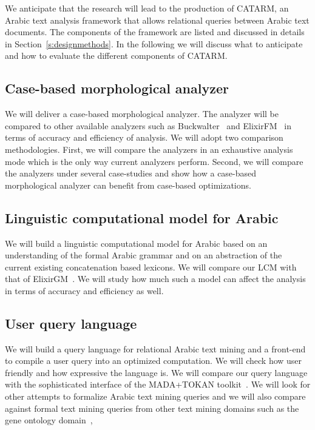 \documentclass[12pt]{article}
\begin{document}
We anticipate that the research will lead to the production of 
CATARM, an Arabic text analysis framework that allows relational 
queries between Arabic text documents.
The components of the framework are listed and discussed
in details in Section~\ref{s:designmethods}.
In the following we will discuss what to anticipate and 
how to evaluate the different components of CATARM. 

\subsection{Case-based morphological analyzer} 

We will deliver a case-based morphological analyzer. 
The analyzer will be compared to other available analyzers such as
Buckwalter~\cite{Tim04} and ElixirFM~\cite{Otakar:07} in terms
of accuracy and efficiency of analysis.
We will adopt two comparison methodologies. 
First, we will compare the analyzers in an exhaustive analysis mode
which is the only way current analyzers perform. 
Second, we will compare the analyzers under several case-studies
and show how a case-based morphological analyzer can benefit
from case-based optimizations.

\subsection{Linguistic computational model for Arabic}

We will build a linguistic computational model for Arabic 
based on an understanding of the formal Arabic grammar 
and on an abstraction of the current existing concatenation
based lexicons.
We will compare our LCM with that of ElixirGM~\cite{Otakar:07}.
We will study how much such a model can affect the analysis
in terms of accuracy and efficiency as well. 

\subsection{User query language}

We will build a query language for relational Arabic text mining 
and a front-end to compile a user query into an optimized
computation. 
We will check how user friendly and how expressive the language is.
We will compare our query language with the sophisticated 
interface of the MADA+TOKAN toolkit~\cite{Habash:09}.
We will look for other attempts to formalize Arabic text 
mining queries and we will also compare against 
formal text mining queries from other text mining domains such
as the gene ontology domain~\cite{GeneOntology10},
\end{document}
